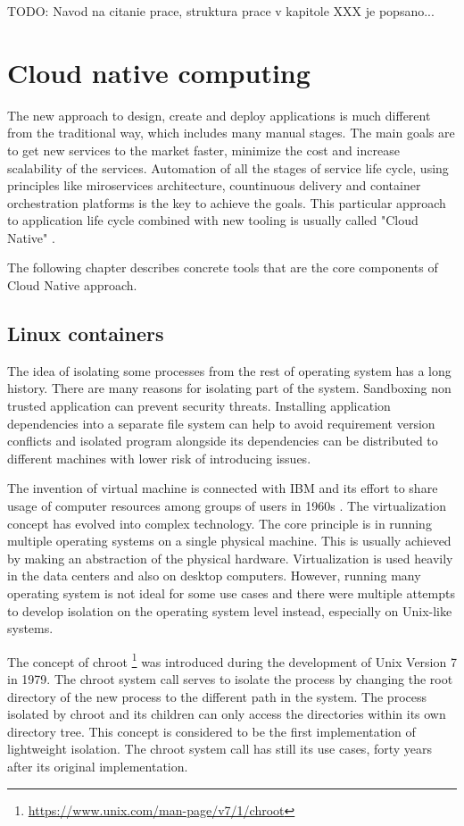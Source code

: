\documentclass[
  digital, %
  twoside, %
  table,   %
  lof,     %
  lot,     %
]{fithesis3}
\begin{document}
TODO: Navod na citanie prace, struktura prace v kapitole XXX je popsano...

\chapter{Cloud native computing}
The new approach to design, create and deploy applications is much different from the traditional way, which includes many manual stages. The main goals are to get new services to the market faster, minimize the cost and increase scalability of the services. Automation of all the stages of service life cycle, using principles like miroservices architecture, countinuous delivery and container orchestration platforms is the key to achieve the goals. This particular approach to application life cycle combined with new tooling is usually called "Cloud Native" \cite{cloud_native}.

The following chapter describes concrete tools that are the core components of Cloud Native approach.

\section{Linux containers} \label{sec:containers}
The idea of isolating some processes from the rest of operating system has a long history. There are many reasons for isolating part of the system. Sandboxing non trusted application can prevent security threats. Installing application dependencies into a separate file system can help to avoid requirement version conflicts and isolated program alongside its dependencies can be distributed to different machines with lower risk of introducing issues.

The invention of virtual machine is connected with IBM and its effort to share usage of computer resources among groups of users in 1960s \cite{vm_history}. The virtualization concept has evolved into complex technology. The core principle is in running multiple operating systems on a single physical machine. This is usually achieved by making an abstraction of the physical hardware. Virtualization is used heavily in the data centers and also on desktop computers. However, running many operating system is not ideal for some use cases and there were multiple attempts to develop isolation on the operating system level instead, especially on Unix-like systems.

The concept of chroot \footnote{\url{https://www.unix.com/man-page/v7/1/chroot}} was introduced during the development of Unix Version 7 in 1979. The chroot system call serves to isolate the process by changing the root directory of the new process to the different path in the system. The process isolated by chroot and its children can only access the directories within its own directory tree. This concept is considered to be the first implementation of lightweight isolation. The chroot system call has still its use cases, forty years after its original implementation.
\end{document}
